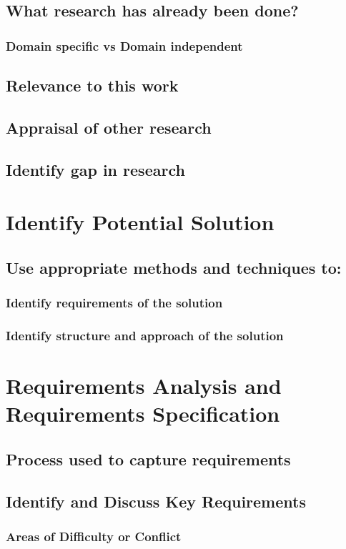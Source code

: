 \documentclass{report}
\begin{document}
\section{What research has already been done?}
\subsection{Domain specific vs Domain independent}
\section{Relevance to this work}
\section{Appraisal of other research}
\section{Identify gap in research}

\chapter{Identify Potential Solution}
\section{Use appropriate methods and techniques to:}
\subsection{Identify requirements of the solution}
\subsection{Identify structure and approach of the solution}

\chapter{Requirements Analysis and Requirements Specification}
\section{Process used to capture requirements}
\section{Identify and Discuss Key Requirements}
\subsection{Areas of Difficulty or Conflict}
\end{document}
